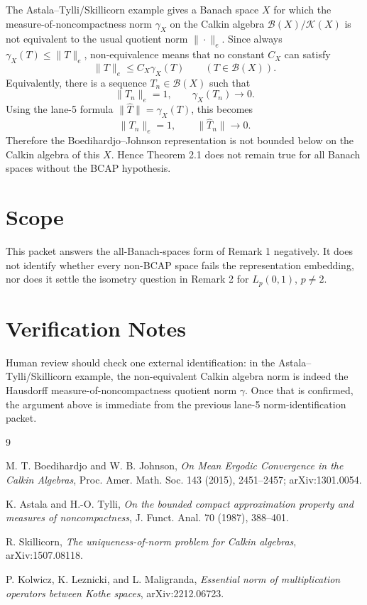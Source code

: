\documentclass[11pt]{article}
\newcommand{\B}{\mathcal B}
\newcommand{\K}{\mathcal K}
\newcommand{\wh}{\widehat}
\begin{document}
The Astala--Tylli/Skillicorn example gives a Banach space \(X\) for which the
measure-of-noncompactness norm \(\gamma_X\) on the Calkin algebra
\(\B(X)/\K(X)\) is not equivalent to the usual quotient norm
\(\|\cdot\|_e\).  Since always \(\gamma_X(T)\le\|T\|_e\), non-equivalence means
that no constant \(C_X\) can satisfy
\[
  \|T\|_e\le C_X\gamma_X(T)\qquad (T\in\B(X)).
\]
Equivalently, there is a sequence \(T_n\in\B(X)\) such that
\[
  \|T_n\|_e=1,\qquad \gamma_X(T_n)\longrightarrow 0.
\]
Using the lane-5 formula \(\|\wh T\|=\gamma_X(T)\), this becomes
\[
  \|T_n\|_e=1,\qquad \|\wh T_n\|\longrightarrow 0.
\]
Therefore the Boedihardjo--Johnson representation is not bounded below on the
Calkin algebra of this \(X\).  Hence Theorem 2.1 does not remain true for all
Banach spaces without the BCAP hypothesis.

\section*{Scope}

This packet answers the all-Banach-spaces form of Remark 1 negatively.  It does
not identify whether every non-BCAP space fails the representation embedding,
nor does it settle the isometry question in Remark 2 for \(L_p(0,1)\),
\(p\ne2\).

\section*{Verification Notes}

Human review should check one external identification: in the
Astala--Tylli/Skillicorn example, the non-equivalent Calkin algebra norm is
indeed the Hausdorff measure-of-noncompactness quotient norm \(\gamma\).  Once
that is confirmed, the argument above is immediate from the previous lane-5
norm-identification packet.

\begin{thebibliography}{9}

M. T. Boedihardjo and W. B. Johnson,
\emph{On Mean Ergodic Convergence in the Calkin Algebras},
Proc. Amer. Math. Soc. 143 (2015), 2451--2457; arXiv:1301.0054.

K. Astala and H.-O. Tylli,
\emph{On the bounded compact approximation property and measures of
noncompactness},
J. Funct. Anal. 70 (1987), 388--401.

R. Skillicorn,
\emph{The uniqueness-of-norm problem for Calkin algebras},
arXiv:1507.08118.

P. Kolwicz, K. Leznicki, and L. Maligranda,
\emph{Essential norm of multiplication operators between Kothe spaces},
arXiv:2212.06723.

\end{thebibliography}
\end{document}
